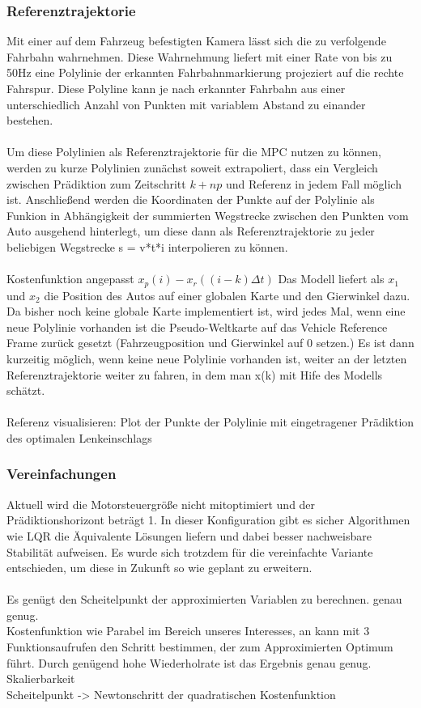 \subsubsection{Referenztrajektorie}
Mit einer auf dem Fahrzeug befestigten Kamera lässt sich die zu verfolgende Fahrbahn wahrnehmen. Diese Wahrnehmung liefert mit einer Rate von bis zu 50Hz eine Polylinie der erkannten Fahrbahnmarkierung projeziert auf die rechte Fahrspur. Diese Polyline kann je nach erkannter Fahrbahn aus einer unterschiedlich Anzahl von Punkten mit variablem Abstand zu einander bestehen.\\ \\
Um diese Polylinien als Referenztrajektorie für die MPC nutzen zu können, werden zu kurze Polylinien zunächst soweit extrapoliert, dass ein Vergleich zwischen Prädiktion zum Zeitschritt $k+np$ und Referenz in jedem Fall möglich ist. Anschließend werden die Koordinaten der Punkte auf der Polylinie als Funkion in Abhängigkeit der summierten Wegstrecke zwischen den Punkten vom Auto ausgehend hinterlegt, um diese dann als Referenztrajektorie zu jeder beliebigen Wegstrecke s = v*t*i interpolieren zu können.\\ \\
Kostenfunktion angepasst $x_p(i)-x_r((i-k)\Delta t)$
Das Modell liefert als $x_1$ und $x_2$ die Position des Autos auf einer globalen Karte und den Gierwinkel dazu. Da bisher noch keine globale Karte implementiert ist, wird jedes Mal, wenn eine neue Polylinie vorhanden ist die Pseudo-Weltkarte auf das Vehicle Reference Frame zurück gesetzt (Fahrzeugposition und Gierwinkel auf 0 setzen.) Es ist dann kurzeitig möglich, wenn keine neue Polylinie vorhanden ist, weiter an der letzten Referenztrajektorie weiter zu fahren, in dem man x(k) mit Hife des Modells schätzt.\\ \\
Referenz visualisieren: Plot der Punkte der Polylinie mit eingetragener Prädiktion des optimalen Lenkeinschlags\\
\subsubsection{Vereinfachungen}
Aktuell wird die Motorsteuergröße nicht mitoptimiert und der Prädiktionshorizont beträgt 1. In dieser Konfiguration gibt es sicher Algorithmen wie LQR die Äquivalente Lösungen liefern und dabei besser nachweisbare Stabilität aufweisen. Es wurde sich trotzdem für die vereinfachte Variante entschieden, um diese in Zukunft so wie geplant zu erweitern.\\ \\
Es genügt den Scheitelpunkt der approximierten Variablen zu berechnen. genau genug.\\
Kostenfunktion wie Parabel im Bereich unseres Interesses, an kann mit 3 Funktionsaufrufen den Schritt bestimmen, der zum Approximierten Optimum führt. Durch genügend hohe Wiederholrate ist das Ergebnis genau genug.
Skalierbarkeit\\
Scheitelpunkt -> Newtonschritt der quadratischen Kostenfunktion\\


